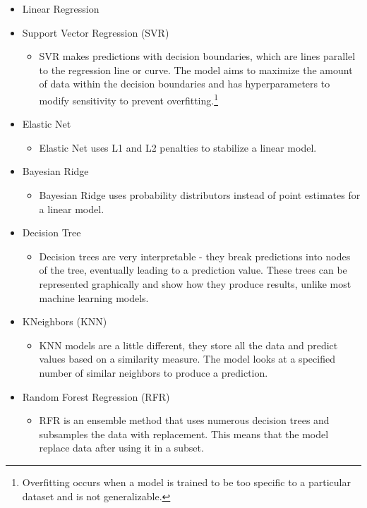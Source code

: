 \documentclass[twocolumn, nofootinbib, secnumarabic, amssymb, nobibnotes, aps, prd]{revtex4-2}
\begin{document}
\begin{itemize}
  \item Linear Regression
  \item Support Vector Regression (SVR)
  \begin{itemize}
  		\item  SVR makes predictions with decision boundaries, which are lines parallel to the regression line or curve. The model aims to maximize the amount of data within the decision boundaries and has hyperparameters to modify sensitivity to prevent overfitting.\footnote{Overfitting occurs when a model is trained to be too specific to a particular dataset and is not generalizable.}
  \end{itemize}
  \item Elastic Net
  \begin{itemize}
  		\item Elastic Net uses L1 and L2 penalties to stabilize a linear model.
  \end{itemize}
  \item Bayesian Ridge
  \begin{itemize}
  		\item Bayesian Ridge uses probability distributors instead of point estimates for a linear model.
  \end{itemize}
  \item Decision Tree
  \begin{itemize}
  		\item Decision trees are very interpretable - they break predictions into nodes of the tree, eventually leading to a prediction value. These trees can be represented graphically and show how they produce results, unlike most machine learning models.
  \end{itemize}
  \item KNeighbors (KNN)
  \begin{itemize}
  		\item KNN models are a little different, they store all the data and predict values based on a similarity measure. The model looks at a specified number of similar neighbors to produce a prediction.
  \end{itemize}
  \item Random Forest Regression (RFR)
  \begin{itemize}
  		\item RFR is an ensemble method that uses numerous decision trees and subsamples the data with replacement. This means that the model replace data after using it in a subset.
  \end{itemize}

\end{itemize}
\end{document}
